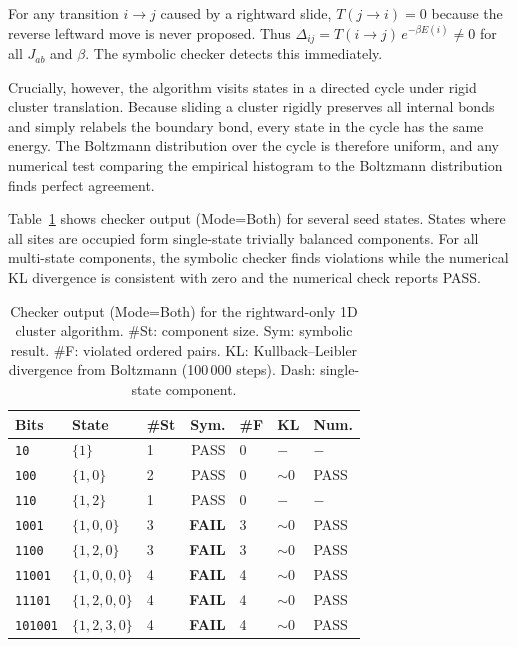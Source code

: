 \documentclass[twocolumn,10pt]{article}
\begin{document}
For any transition $i\to j$ caused by a rightward slide, $T(j\to i)=0$
because the reverse leftward move is never proposed.  Thus
$\Delta_{ij} = T(i\to j)\,e^{-\beta E(i)}\neq 0$ for all $J_{ab}$ and
$\beta$.  The symbolic checker detects this immediately.

Crucially, however, the algorithm visits states in a directed cycle under
rigid cluster translation.  Because sliding a cluster rigidly preserves all
internal bonds and simply relabels the boundary bond, every state in the
cycle has the same energy.  The Boltzmann distribution over the cycle is
therefore uniform, and any numerical test comparing the empirical histogram
to the Boltzmann distribution finds perfect agreement.

Table~\ref{tab:cluster} shows checker output (Mode=Both) for several seed
states.  States where all sites are occupied form single-state trivially
balanced components.  For all multi-state components, the symbolic checker
finds violations while the numerical KL divergence is consistent with zero
and the numerical check reports PASS.

\begin{table}[t]
  \centering
  \caption{Checker output (Mode=Both) for the rightward-only 1D cluster
    algorithm.  \#St: component size.  Sym: symbolic result.  \#F: violated
    ordered pairs.  KL: Kullback--Leibler divergence from Boltzmann (100\,000
    steps).  Dash: single-state component.}
  \label{tab:cluster}
  \small
  \setlength{\tabcolsep}{3pt}
  \begin{tabular}{@{}lllrlll@{}}
    \toprule
    Bits & State & \#St & Sym. & \#F & KL & Num. \\
    \midrule
    \texttt{10}      & $\{1\}$       & 1 & PASS         & 0 & $-$  & $-$  \\
    \texttt{100}     & $\{1,0\}$     & 2 & PASS         & 0 & ${\sim}0$ & PASS \\
    \texttt{110}     & $\{1,2\}$     & 1 & PASS         & 0 & $-$  & $-$  \\
    \texttt{1001}    & $\{1,0,0\}$   & 3 & \textbf{FAIL}& 3 & ${\sim}0$ & PASS \\
    \texttt{1100}    & $\{1,2,0\}$   & 3 & \textbf{FAIL}& 3 & ${\sim}0$ & PASS \\
    \texttt{11001}   & $\{1,0,0,0\}$ & 4 & \textbf{FAIL}& 4 & ${\sim}0$ & PASS \\
    \texttt{11101}   & $\{1,2,0,0\}$ & 4 & \textbf{FAIL}& 4 & ${\sim}0$ & PASS \\
    \texttt{101001}  & $\{1,2,3,0\}$ & 4 & \textbf{FAIL}& 4 & ${\sim}0$ & PASS \\
    \bottomrule
  \end{tabular}
\end{table}
\end{document}
